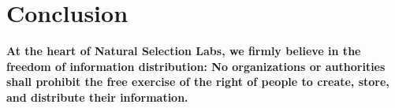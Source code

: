\section{Conclusion} 

\textbf{At the heart of Natural Selection Labs, we firmly believe in the freedom of information distribution: No organizations or authorities shall prohibit the free exercise of the right of people to create, store, and distribute their information.}